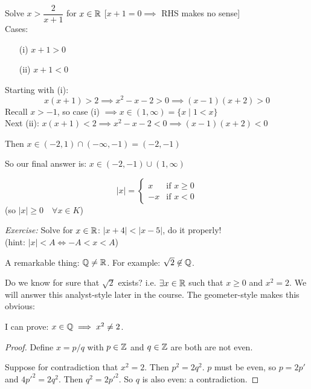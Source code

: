 \documentclass[twoside]{scrartcl}
\begin{document}
\begin{example}
Solve $x > \dfrac{2}{x+1}$ for $x \in \mathbb{R}$ [$x + 1 = 0 \implies$ RHS makes no sense] \\

Cases: \begin{enumerate}
 \item[(i)]$x + 1 > 0$ 
 \item[(ii)] $x+1<0$ 
 \end{enumerate}

 Starting with (i):
 \[x(x+1) > 2 \implies x^2 - x - 2 >0 \implies (x-1)(x+2)>0\]
 Recall $x > -1$, so case (i) $\implies x \in (1,\infty) = \{x \;|\; 1 < x\}$\\
 
 Next (ii): $x(x+1) <2 \implies x^2 - x - 2 < 0 \implies (x-1)(x+2) < 0$
 
 Then $x \in (-2,1) \cap (-\infty,-1) = (-2,-1)$

So our final answer is:
$\boxed{x \in (-2,-1) \cup (1,\infty) }$
\end{example}\pagebreak


\begin{definition}
\[|x| = \begin{cases}
 x & \text{if } x \geq 0\\
 -x &\text{if } x < 0
 \end{cases}\]
 (so $|x| \geq 0\quad \forall x\in K$)
 \end{definition}

\emph{Exercise:} Solve for $x \in\mathbb{R}$: $|x+4| < |x-5|$, do it properly!\\ (hint: $|x| < A \iff -A < x < A$)



A remarkable  thing: $\mathbb{Q} \neq \mathbb{R}$. For example: $\sqrt{2} \not\in \mathbb{Q}$. 

Do we know for sure that $\sqrt{2}$ exists? i.e. $\exists x \in\mathbb{R}$ such that $x \geq 0$ and $x^2 =2$. We will answer this analyst-style later in the course. The geometer-style makes this obvious: 
\begin{center}
\end{center}

I can prove: $x \in \mathbb{Q} \implies x^2 \neq 2$. 
\begin{proof}
Define $x = p/q$ with $p \in \mathbb{Z}$ and $q\in \mathbb{Z}$ are both are not even. 

Suppose for contradiction that $x^2 = 2$. Then $p^2 = 2q^2$. $p$ must be even, so $p = 2p'$ and $4p'^2 = 2q^2$. Then $q^2 = 2p'^2$. So $q$ is also even: a contradiction. 
\end{proof}
\end{document}

